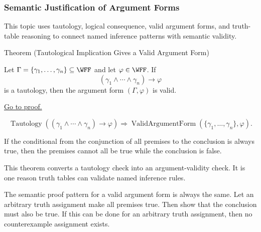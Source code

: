 \subsubsection*{Semantic Justification of Argument Forms}

\begin{remark*}
This topic uses tautology, logical consequence, valid argument forms, and
truth-table reasoning to connect named inference patterns with semantic
validity.
\end{remark*}

\begin{theorembox}{Theorem (Tautological Implication Gives a Valid Argument Form)}
\begin{theorem}
\label{thm:tautological-implication-valid-argument-form-propositional-logic}
Let \(\Gamma=\{\gamma_1,\ldots,\gamma_n\}\subseteq\WFF\) and let
\(\varphi\in\WFF\). If
\[
(\gamma_1\land\cdots\land\gamma_n)\to\varphi
\]
is a tautology, then the argument form \((\Gamma,\varphi)\) is valid.

\noindent\hyperref[prf:tautological-implication-valid-argument-form-propositional-logic]{Go to proof.}
\end{theorem}
\end{theorembox}

\begin{remark*}
\[
\operatorname{Tautology}((\gamma_1\land\cdots\land\gamma_n)\to\varphi)
\Longrightarrow
\operatorname{ValidArgumentForm}(\{\gamma_1,
\ldots,\gamma_n\},\varphi).
\]
\end{remark*}

\begin{remark*}
If the conditional from the conjunction of all premises to the conclusion is
always true, then the premises cannot all be true while the conclusion is false.
\end{remark*}

\begin{remark*}[Interpretation]
This theorem converts a tautology check into an argument-validity check. It is
one reason truth tables can validate named inference rules.
\end{remark*}

\begin{remark*}[Exposition]
The semantic proof pattern for a valid argument form is always the same. Let an
arbitrary truth assignment make all premises true. Then show that the conclusion
must also be true. If this can be done for an arbitrary truth assignment, then no
counterexample assignment exists.
\end{remark*}

